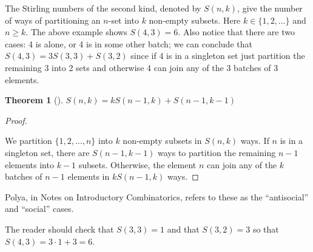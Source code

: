 \documentclass[10pt,]{book}
\theoremstyle{plain}
\newtheorem{theorem}{Theorem}[section]
\theoremstyle{definition}
\theoremstyle{definition}
\theoremstyle{definition}
\theoremstyle{definition}
\numberwithin{equation}{chapter}
\begin{document}
\par
\hypertarget{p-1176}{}%
The Stirling numbers of the second kind, denoted by \(S(n,k)\), give the number of ways of partitioning an \(n\)-set into \(k\) non-empty subsets. Here \(k \in \{1,2,\ldots\}\) and \(n \geq k\). The above example shows \(S(4, 3) = 6\). Also notice that there are two cases: 4 is alone, or 4 is in some other batch; we can conclude that \(S(4, 3) = 3S(3,3) + S(3,2)\) since if 4 is in a singleton set just partition the remaining 3 into 2 sets and otherwise 4 can join any of the 3 batches of 3 elements.%
\begin{theorem}[{}]\label{thm-stirling-recursion}
\hypertarget{p-1177}{}%
\(S(n,k) = kS(n - 1,k) + S(n - 1,k - 1)\)%
\end{theorem}
\begin{proof}\hypertarget{proof-11}{}
\hypertarget{p-1178}{}%
We partition \(\{1,2,\ldots,n\}\) into \(k\) non-empty subsets in \(S(n,k)\) ways. If \(n\) is in a singleton set, there are \(S(n - 1,k - 1)\) ways to partition the remaining \(n - 1\) elements into \(k - 1\) subsets. Otherwise, the element \(n\) can join any of the \(k\) batches of \(n-1\) elements in \(kS(n - 1,k)\) ways.%
\end{proof}
\hypertarget{p-1179}{}%
Polya, in Notes on Introductory Combinatorics, refers to these as the ``antisocial'' and ``social'' cases.%
\par
\hypertarget{p-1180}{}%
The reader should check that \(S(3,3) = 1\) and that \(S(3,2) = 3\) so that \(S(4,3) = 3 \cdot 1 + 3 = 6\).%
\typeout{************************************************}
\typeout{************************************************}
\end{document}
